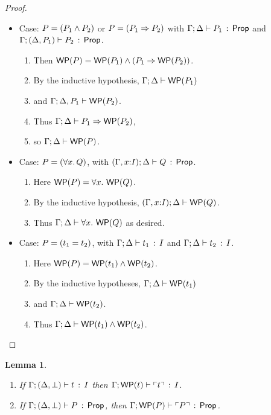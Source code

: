 \documentclass[10pt,a4paper]{article}
\newtheorem{lemma}[theorem]{Lemma}
\begin{document}
\begin{proof}
\begin{itemize}
  \item Case: $P = (P_1 \wedge P_2)$ or $P = (P_1 \Rightarrow P_2)$ with
       $\Gamma;\Delta \vdash P_1\, :\, \mathsf{Prop}$ and 
              $\Gamma;(\Delta,P_1) \vdash P_2\, :\, \mathsf{Prop}$.
       \begin{enumerate}
       \item Then $\mathop{\mathsf{WP}}(P) = \mathop{\mathsf{WP}}(P_1) \wedge (P_1 \Rightarrow \mathop{\mathsf{WP}}(P_2))$.
       \item By the inductive hypothesis,
         $\Gamma;\Delta \vdash \mathop{\mathsf{WP}}(P_1)$
       \item 
         and $\Gamma;\Delta,P_1 \vdash \mathop{\mathsf{WP}}(P_2)$.
       \item 
         Thus $\Gamma;\Delta \vdash P_1 \Rightarrow \mathop{\mathsf{WP}}(P_2)$,
       \item
         so $\Gamma;\Delta \vdash \mathop{\mathsf{WP}}(P)$.    
       \end{enumerate}
  \item Case: $P=(\forall x.\, Q)$, 
        with $(\Gamma,x{:}I);\Delta \vdash Q\, :\, \mathsf{Prop}$.
  	\begin{enumerate}
	\item 
		Here $\mathop{\mathsf{WP}}(P) = \forall x.\, \mathop{\mathsf{WP}}(Q)$.
	\item 
		By the inductive hypothesis,
	   $(\Gamma,x{:}I);\Delta \vdash \mathop{\mathsf{WP}}(Q)$.
	\item 
		Thus
	   $\Gamma;\Delta \vdash \forall x.\, \mathop{\mathsf{WP}}(Q)$ as desired.
	\end{enumerate}
  \item Case: $P = (t_1 = t_2)$, with $\Gamma;\Delta \vdash t_1\, :\, I$ and $\Gamma;\Delta \vdash t_2\, :\, I$. 
    	\begin{enumerate}
	\item 
		Here $\mathop{\mathsf{WP}}(P) = \mathop{\mathsf{WP}}(t_1) \wedge \mathop{\mathsf{WP}}(t_2)$.
	\item 
		By the inductive hypotheses,
		$\Gamma;\Delta \vdash \mathop{\mathsf{WP}}(t_1)$ 
	\item 
		and $\Gamma;\Delta \vdash \mathop{\mathsf{WP}}(t_2)$.
	\item
		Thus $\Gamma;\Delta \vdash \mathop{\mathsf{WP}}(t_1) \wedge \mathop{\mathsf{WP}}(t_2)$.
	\end{enumerate}       
  \end{itemize}
\end{proof}

\clearpage

\begin{lemma}
\label{lemma:l9}
\mbox{}
  \begin{enumerate}
  \item If $\Gamma;(\Delta,\bot) \vdash t\, :\, I$ then
    $\Gamma;\mathop{\mathsf{WP}}(t) \vdash \ulcorner t \urcorner\, :\, I$.
  \item If $\Gamma;(\Delta,\bot) \vdash P\, :\, \mathsf{Prop}$, then
    $\Gamma;\mathop{\mathsf{WP}}(P) \vdash \ulcorner P \urcorner\, :\, \mathsf{Prop}$.
  \end{enumerate}
\end{lemma}
\end{document}
